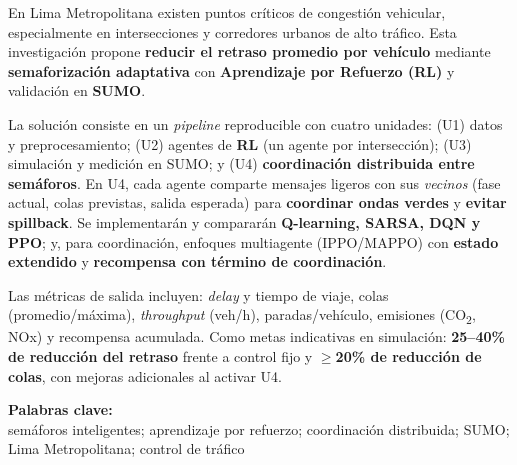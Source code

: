 
En Lima Metropolitana existen puntos críticos de congestión vehicular, especialmente en intersecciones y corredores urbanos de alto tráfico. Esta investigación propone \textbf{reducir el retraso promedio por vehículo} mediante \textbf{semaforización adaptativa} con \textbf{Aprendizaje por Refuerzo (RL)} y validación en \textbf{SUMO}.

La solución consiste en un \textit{pipeline} reproducible con cuatro unidades: (U1) datos y preprocesamiento; (U2) agentes de \textbf{RL} (un agente por intersección); (U3) simulación y medición en SUMO; y (U4) \textbf{coordinación distribuida entre semáforos}. En U4, cada agente comparte mensajes ligeros con sus \textit{vecinos} (fase actual, colas previstas, salida esperada) para \textbf{coordinar ondas verdes} y \textbf{evitar spillback}. Se implementarán y compararán \textbf{Q-learning, SARSA, DQN y PPO}; y, para coordinación, enfoques multiagente (IPPO/MAPPO) con \textbf{estado extendido} y \textbf{recompensa con término de coordinación}.

Las métricas de salida incluyen: \textit{delay} y tiempo de viaje, colas (promedio/máxima), \textit{throughput} (veh/h), paradas/vehículo, emisiones (CO\textsubscript{2}, NOx) y recompensa acumulada. Como metas indicativas en simulación: \textbf{25–40\% de reducción del retraso} frente a control fijo y \textbf{$\geq$20\% de reducción de colas}, con mejoras adicionales al activar U4.

\noindent \textbf{Palabras clave:}\\
\noindent semáforos inteligentes; aprendizaje por refuerzo; coordinación distribuida; SUMO; Lima Metropolitana; control de tráfico
